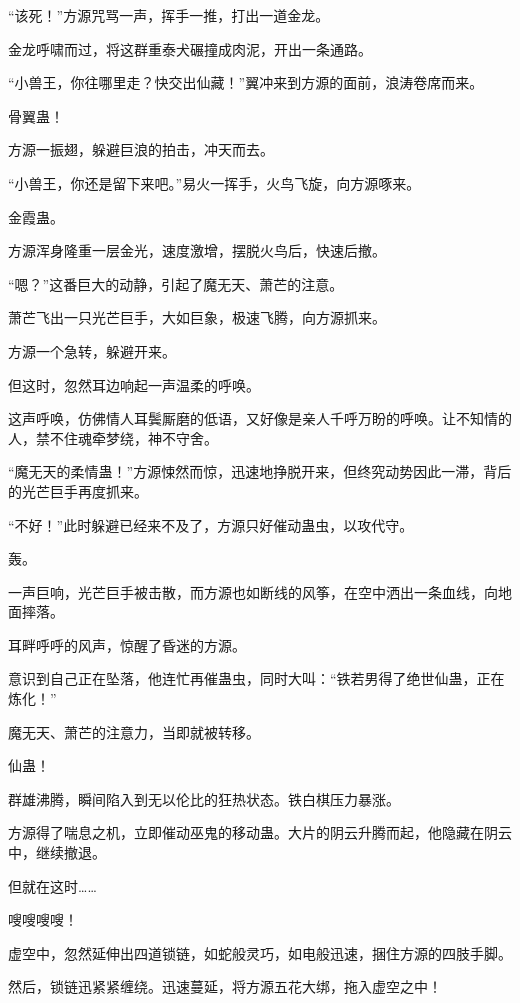 
\begin{this_body}

“该死！”方源咒骂一声，挥手一推，打出一道金龙。

金龙呼啸而过，将这群重泰犬碾撞成肉泥，开出一条通路。

“小兽王，你往哪里走？快交出仙藏！”翼冲来到方源的面前，浪涛卷席而来。

骨翼蛊！

方源一振翅，躲避巨浪的拍击，冲天而去。

“小兽王，你还是留下来吧。”易火一挥手，火鸟飞旋，向方源啄来。

金霞蛊。

方源浑身隆重一层金光，速度激增，摆脱火鸟后，快速后撤。

“嗯？”这番巨大的动静，引起了魔无天、萧芒的注意。

萧芒飞出一只光芒巨手，大如巨象，极速飞腾，向方源抓来。

方源一个急转，躲避开来。

但这时，忽然耳边响起一声温柔的呼唤。

这声呼唤，仿佛情人耳鬓厮磨的低语，又好像是亲人千呼万盼的呼唤。让不知情的人，禁不住魂牵梦绕，神不守舍。

“魔无天的柔情蛊！”方源悚然而惊，迅速地挣脱开来，但终究动势因此一滞，背后的光芒巨手再度抓来。

“不好！”此时躲避已经来不及了，方源只好催动蛊虫，以攻代守。

轰。

一声巨响，光芒巨手被击散，而方源也如断线的风筝，在空中洒出一条血线，向地面摔落。

耳畔呼呼的风声，惊醒了昏迷的方源。

意识到自己正在坠落，他连忙再催蛊虫，同时大叫：“铁若男得了绝世仙蛊，正在炼化！”

魔无天、萧芒的注意力，当即就被转移。

仙蛊！

群雄沸腾，瞬间陷入到无以伦比的狂热状态。铁白棋压力暴涨。

方源得了喘息之机，立即催动巫鬼的移动蛊。大片的阴云升腾而起，他隐藏在阴云中，继续撤退。

但就在这时……

嗖嗖嗖嗖！

虚空中，忽然延伸出四道锁链，如蛇般灵巧，如电般迅速，捆住方源的四肢手脚。

然后，锁链迅紧紧缠绕。迅速蔓延，将方源五花大绑，拖入虚空之中！


\end{this_body}
